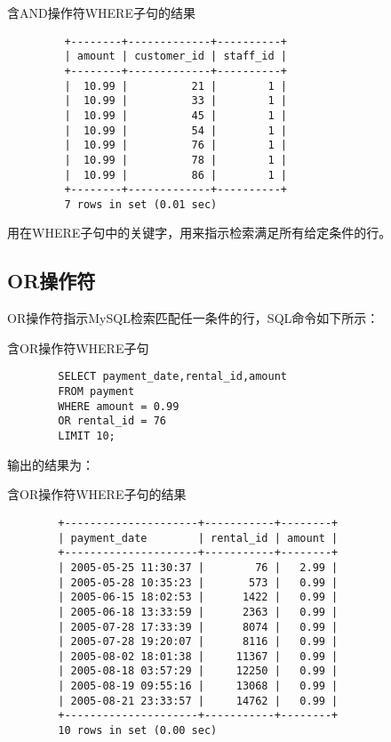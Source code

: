 \documentclass[UTF8]{article}
\begin{document}
\begin{listing}[H]
	\caption{含AND操作符WHERE子句的结果}
	\label{code:andwhereclauseresult}
	\begin{verbatim}
         +--------+-------------+----------+
         | amount | customer_id | staff_id |
         +--------+-------------+----------+
         |  10.99 |          21 |        1 |
         |  10.99 |          33 |        1 |
         |  10.99 |          45 |        1 |
         |  10.99 |          54 |        1 |
         |  10.99 |          76 |        1 |
         |  10.99 |          78 |        1 |
         |  10.99 |          86 |        1 |
         +--------+-------------+----------+
         7 rows in set (0.01 sec)
        \end{verbatim}
\end{listing}
\begin{redbox}[frametitle={Defination 7.2 AND操作符}]
        用在WHERE子句中的关键字，用来指示检索满足所有给定条件的行。
\end{redbox}

\subsection{OR操作符}
OR操作符指示MySQL检索匹配任一条件的行，SQL命令如下所示：
\begin{listing}[H]
	\caption{含OR操作符WHERE子句}
	\label{code:orwhereclause}
        \begin{verbatim}
        SELECT payment_date,rental_id,amount 
        FROM payment 
        WHERE amount = 0.99 
        OR rental_id = 76 
        LIMIT 10;
        \end{verbatim}
\end{listing}

输出的结果为：

\begin{listing}[H]
	\caption{含OR操作符WHERE子句的结果}
	\label{code:orwhereclauseresult}
\begin{verbatim}
        +---------------------+-----------+--------+
        | payment_date        | rental_id | amount |
        +---------------------+-----------+--------+
        | 2005-05-25 11:30:37 |        76 |   2.99 |
        | 2005-05-28 10:35:23 |       573 |   0.99 |
        | 2005-06-15 18:02:53 |      1422 |   0.99 |
        | 2005-06-18 13:33:59 |      2363 |   0.99 |
        | 2005-07-28 17:33:39 |      8074 |   0.99 |
        | 2005-07-28 19:20:07 |      8116 |   0.99 |
        | 2005-08-02 18:01:38 |     11367 |   0.99 |
        | 2005-08-18 03:57:29 |     12250 |   0.99 |
        | 2005-08-19 09:55:16 |     13068 |   0.99 |
        | 2005-08-21 23:33:57 |     14762 |   0.99 |
        +---------------------+-----------+--------+
        10 rows in set (0.00 sec)
\end{verbatim}
\end{listing}
\end{document}
